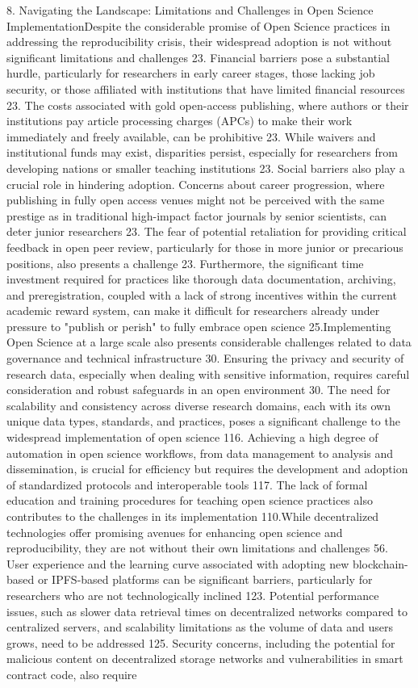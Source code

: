 \documentclass{article}
\begin{document}
8. Navigating the Landscape: Limitations and Challenges in Open Science ImplementationDespite the considerable promise of Open Science practices in addressing the reproducibility crisis, their widespread adoption is not without significant limitations and challenges 23. Financial barriers pose a substantial hurdle, particularly for researchers in early career stages, those lacking job security, or those affiliated with institutions that have limited financial resources 23. The costs associated with gold open-access publishing, where authors or their institutions pay article processing charges (APCs) to make their work immediately and freely available, can be prohibitive 23. While waivers and institutional funds may exist, disparities persist, especially for researchers from developing nations or smaller teaching institutions 23. Social barriers also play a crucial role in hindering adoption. Concerns about career progression, where publishing in fully open access venues might not be perceived with the same prestige as in traditional high-impact factor journals by senior scientists, can deter junior researchers 23. The fear of potential retaliation for providing critical feedback in open peer review, particularly for those in more junior or precarious positions, also presents a challenge 23. Furthermore, the significant time investment required for practices like thorough data documentation, archiving, and preregistration, coupled with a lack of strong incentives within the current academic reward system, can make it difficult for researchers already under pressure to "publish or perish" to fully embrace open science 25.Implementing Open Science at a large scale also presents considerable challenges related to data governance and technical infrastructure 30. Ensuring the privacy and security of research data, especially when dealing with sensitive information, requires careful consideration and robust safeguards in an open environment 30. The need for scalability and consistency across diverse research domains, each with its own unique data types, standards, and practices, poses a significant challenge to the widespread implementation of open science 116. Achieving a high degree of automation in open science workflows, from data management to analysis and dissemination, is crucial for efficiency but requires the development and adoption of standardized protocols and interoperable tools 117. The lack of formal education and training procedures for teaching open science practices also contributes to the challenges in its implementation 110.While decentralized technologies offer promising avenues for enhancing open science and reproducibility, they are not without their own limitations and challenges 56. User experience and the learning curve associated with adopting new blockchain-based or IPFS-based platforms can be significant barriers, particularly for researchers who are not technologically inclined 123. Potential performance issues, such as slower data retrieval times on decentralized networks compared to centralized servers, and scalability limitations as the volume of data and users grows, need to be addressed 125. Security concerns, including the potential for malicious content on decentralized storage networks and vulnerabilities in smart contract code, also require 
\end{document}
